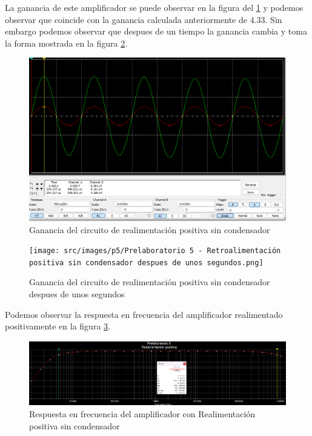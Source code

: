 La ganancia de este amplificador se puede observar en la figura del \ref{fig:ganancia-circuito-realimentacion-positiva-sin-condensador} y podemos observar que coincide con la ganancia calculada anteriormente de 4.33. Sin embargo podemos observar que despues de un tiempo la ganancia cambia y toma la forma mostrada en la figura \ref{fig:ganancia-circuito-realimentacion-positiva-sin-condensador-despues-de-unos-segundos}.

\begin{figure}[ht]
    \centering
    \includegraphics[width=\textwidth]{src/images/p5/Prelaboratorio 5 - Realimentacion positiva sin condensador - ganancia.png}
    \caption{Ganancia del circuito de realimentación positiva sin condensador}
    \label{fig:ganancia-circuito-realimentacion-positiva-sin-condensador}
\end{figure}
\FloatBarrier


\begin{figure}[ht]
    \centering
    \texttt{[image: src/images/p5/Prelaboratorio 5 - Retroalimentación positiva sin condensador despues de unos segundos.png]}
    \caption{Ganancia del circuito de realimentación positiva sin condensador despues de unos segundos}
    \label{fig:ganancia-circuito-realimentacion-positiva-sin-condensador-despues-de-unos-segundos}
\end{figure}
\FloatBarrier

Podemos observar la respuesta en frecuencia del amplificador realimentado positivamente en la figura \ref{fig:respuesta-amplificador-realimentacion-positiva-sin-condensador}.

\begin{figure}[ht]
    \centering
    \includegraphics[width=\textwidth]{src/images/p5/Prelaboratorio 5 - realimentacion positiva sin condensador - respuesta en frecuencia.png}
    \caption{Respuesta en frecuencia del amplificador con Realimentación positiva sin condensador} 
    \label{fig:respuesta-amplificador-realimentacion-positiva-sin-condensador}
\end{figure}

